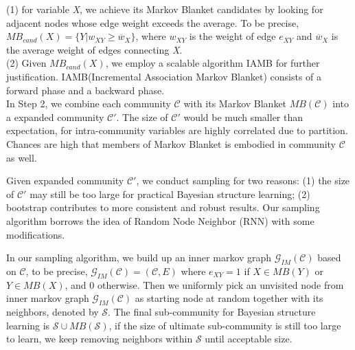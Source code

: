 (1) for variable \emph{X}, we achieve its Markov Blanket candidates by looking for adjacent nodes whose edge weight exceeds the average. To be precise, $MB_{cand}(X)=\{ Y | w_{XY} \geq \overline{w}_{X} \}$, where $w_{XY}$ is the weight of edge $e_{XY}$ and $\overline{w}_{X}$ is the average weight of edges connecting \emph{X}.\\

(2) Given $MB_{cand}(X)$, we employ a scalable algorithm IAMB\cite{iamb} for further justification. IAMB\cite{iamb}(Incremental Association Markov Blanket) consists of a forward phase and a backward phase.\\ %

In Step 2, we combine each community $\mathcal {C}$ with its Markov Blanket $MB(\mathcal {C})$ into a expanded community ${\mathcal {C}}'$. The size of ${\mathcal {C}}'$ would be much smaller than expectation, for intra-community variables are highly correlated due to partition. Chances are high that members of Markov Blanket is embodied in community $\mathcal {C}$ as well.

Given expanded community ${\mathcal {C}}'$, we conduct sampling for two reasons: (1) the size of ${\mathcal {C}}'$ may still be too large for practical Bayesian structure learning; (2) bootstrap contributes to more consistent and robust results. Our sampling algorithm borrows the idea of Random Node Neighbor (RNN)\cite{leskovec2006sampling} with some modifications.

In our sampling algorithm, we build up an inner markov graph $\mathcal{G}_{IM}(\mathcal {C})$ based on $\mathcal {C}$, to be precise, $\mathcal{G}_{IM}(\mathcal {C})=(\mathcal {C},E)$ where $e_{XY}=1$ if $X \in MB(Y)$ or $Y \in MB(X)$, and 0 otherwise. Then we uniformly pick an unvisited node from inner markov graph $\mathcal{G}_{IM}(\mathcal {C})$ as starting node at random together with its neighbors, denoted by $\mathcal {S}$. The final sub-community for Bayesian structure learning is $\mathcal {S} \cup MB(\mathcal {S})$, if the size of ultimate sub-community is still too large to learn, we keep removing neighbors within $\mathcal {S}$ until acceptable size.\\

